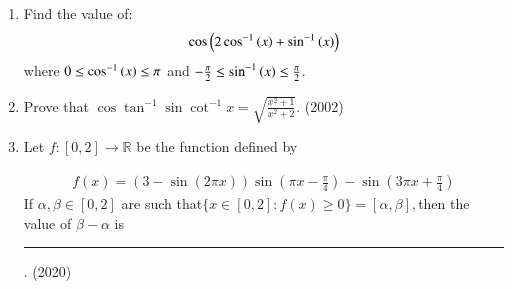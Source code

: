 \begin{enumerate}[label=\thesubsection.\arabic*,ref=\thesubsection.\theenumi]
\begin{enumerate}
\end{enumerate}
\item Find the value of: 
\begin{align*}
\cos \left(2\cos ^{-1}\left(x\right)+\sin ^{-1}\left(x\right)\right) 
\end{align*}
where $0\le \cos ^{-1}\left(x\right) \le \pi$ and $-\frac{\pi}{2}\le \sin ^{-1}\left(x\right) \le\frac{\pi}{2}$.
\hfill {}
	\item{
			Prove that $\cos \tan^{-1} \sin \cot^{-1} x = \sqrt{\frac{x^2 + 1}{x^2 + 2}}$. \hfill (2002)
		}
\item   Let $f: [0,2] \to \mathbb{R}$ be the function defined by

\begin{align*}
	f(x) = (3 - \sin (2\pi x) ) \sin (\pi x - \frac{\pi}{4}) - \sin (3\pi x + \frac{\pi}{4})
\end{align*}
If $\alpha, \beta \in [0,2]$ are such that$\{ x \in [0,2] : f(x) \geq 0 \} = [\alpha, \beta],$then the value of $\beta - \alpha$ is \rule{1cm}{0.1pt}.
		\hfill (2020)
\end{enumerate}
